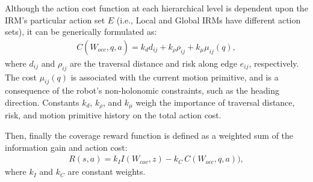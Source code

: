 \documentclass[letterpaper]{article} %
\begin{document}
Although the action cost function at each hierarchical level is dependent upon the IRM's particular action set $E$ (i.e., Local and Global IRMs have different action sets), it can be generically formulated as:
\begin{align}
    C(\hat{W}_{occ}, q, a) = k_d d_{ij} + k_\rho \rho_{ij} + k_\mu \mu_{ij}(q),
\end{align}
where $d_{ij}$ and $\rho_{ij}$ are the traversal distance and risk along edge $e_{ij}$, respectively. The cost $\mu_{ij}(q)$ is associated with the current motion primitive, and is a consequence of the robot's non-holonomic constraints, such as the heading direction. Constants $k_d$, $k_\rho$, and $k_\mu$ weigh the importance of traversal distance, risk, and motion primitive history on the total action cost.

Then, finally the coverage reward function is defined as a weighted sum of the information gain and action cost:
\begin{align}
    R(s, a) = k_I I(W_{cov}, z) - k_C \, C(W_{occ}, q, a)),
\end{align}
where $k_I$ and $k_C$ are constant weights.



\end{document}

